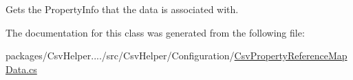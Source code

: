 Gets the Property\-Info that the data is associated with. 



The documentation for this class was generated from the following file\-:\begin{DoxyCompactItemize}
\item 
packages/\-Csv\-Helper..../src/\-Csv\-Helper/\-Configuration/\hyperlink{a00189}{Csv\-Property\-Reference\-Map\-Data.\-cs}\end{DoxyCompactItemize}
